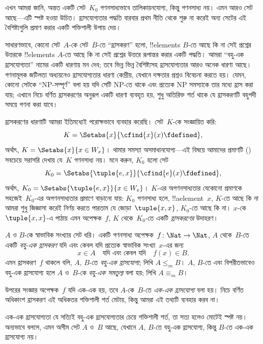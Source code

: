 \documentclass[../../../include/open-logic-section]{subfiles}
\begin{document}

\begin{explain}
এখন আমরা জানি, অন্তত একটি সেট~$K_0$ গণনসাধ্যভাবে তালিকায়নযোগ্য, কিন্তু
গণনসাধ্য নয়। এমন আরও সেট আছে—এটি স্পষ্ট হওয়া উচিত। হ্রাসযোগ্যতার
পদ্ধতি বারবার প্রথম নীতি থেকে শুরু না করেই অন্য সেটের এই বৈশিষ্ট্যগুলি
প্রমাণ করার একটি শক্তিশালী উপায় দেয়।

সাধারণভাবে, কোনো সেট~$A$-কে সেট~$B$-তে “হ্রাসকরণ” হলো, !!{element}s
$B$-তে আছে কি না সেই প্রশ্নের উত্তরকে !!{element}s $A$-তে আছে কি
না সেই প্রশ্নের উত্তরে রূপান্তর করার একটি পদ্ধতি। আমরা “বহু-এক
হ্রাসযোগ্যতা” নামের একটি ধারণায় মন দেব; তবে ভিন্ন ভিন্ন বৈশিষ্ট্যসহ
হ্রাসযোগ্যতার আরও অনেক ধারণা আছে। গণনামূলক জটিলতা অধ্যয়নেও হ্রাসযোগ্যতার
ধারণা কেন্দ্রীয়, যেখানে দক্ষতার প্রশ্নও বিবেচনা করতে হয়। যেমন, কোনো
সেটকে “NP-সম্পূর্ণ” বলা হয় যদি সেটি NP-তে থাকে এবং প্রত্যেক NP সমস্যাকে
তার মধ্যে হ্রাস করা যায়; এখানে নিচে বর্ণিত হ্রাসকরণের অনুরূপ একটি ধারণা
ব্যবহৃত হয়, শুধু অতিরিক্ত শর্ত থাকে যে হ্রাসকরণটি বহুপদী সময়ে গণনা করা
যাবে।

হ্রাসকরণের ধারণাটি আমরা ইতিমধ্যেই পরোক্ষভাবে ব্যবহার করেছি। সেট~$K$-কে
সংজ্ঞায়িত করি:
\[
K = \Setabs{x}{\cfind{x}(x) \fdefined},
\]
অর্থাৎ, $K = \Setabs{x}{x \in W_x}$। থামার সমস্যা অসমাধানযোগ্য—এই
বিষয়ে আমাদের প্রমাণটি () সবচেয়ে সরাসরি
দেখায় যে~$K$ গণনসাধ্য নয়। মনে করুন, $K_0$ হলো সেট
\[
K_0 = \Setabs{\tuple{e, x}}{\cfind{e}(x) \fdefined },
\]
অর্থাৎ, $K_0 = \Setabs{\tuple{e,x}}{x \in W_e}$। $K$-এর
অগণনসাধ্যতার যেকোনো প্রমাণকে সহজেই~$K_0$-এর অগণনসাধ্যতার প্রমাণে
বাড়ানো যায়: $K_0$ গণনসাধ্য হলে, !!a{element}~$x$, $K$-তে আছে কি না
আমরা শুধু জিজ্ঞাসা করেই নির্ণয় করতে পারতাম যে জোড়া~$\tuple{x, x}$,
$K_0$-তে আছে কি না। $x$-কে~$\tuple{x, x}$-এ পাঠায় এমন অপেক্ষক~$f$,
$K$ থেকে~$K_0$-তে একটি \emph{হ্রাসকরণের} উদাহরণ।
\end{explain}

\begin{defn}
$A$ ও $B$-কে স্বাভাবিক সংখ্যার সেট ধরি। একটি গণনসাধ্য
অপেক্ষক~$f\colon \Nat \to \Nat$, $A$ থেকে~$B$-তে একটি \emph{বহু-এক
হ্রাসকরণ} যদি এবং কেবল যদি প্রত্যেক স্বাভাবিক সংখ্যা~$x$-এর জন্য
\[
x \in A \quad \text{যদি এবং কেবল যদি} \quad f(x) \in B.
\]
এমন হ্রাসকরণ~$f$ থাকলে বলি, $A$, $B$-তে \emph{বহু-এক হ্রাসযোগ্য}; লিখি
$A \leq_m B$। $A$, $B$-তে এবং বিপরীতভাবেও বহু-এক হ্রাসযোগ্য হলে $A$
ও~$B$-কে \emph{বহু-এক সমতুল্য} বলা হয়; লিখি $A \equiv_m B$।
\end{defn}

উপরের সংজ্ঞার অপেক্ষক~$f$ যদি এক-এক হয়, তবে $A$-কে~$B$-তে
\emph{এক-এক হ্রাসযোগ্য} বলা হয়। নিচে বর্ণিত অধিকাংশ হ্রাসকরণ এই অধিকতর
শক্তিশালী শর্ত মেটায়, কিন্তু আমরা এই তথ্যটি ব্যবহার করব না।

\begin{digress}
এক-এক হ্রাসযোগ্যতা যে সত্যিই বহু-এক হ্রাসযোগ্যতার চেয়ে শক্তিশালী শর্ত,
তা সত্য হলেও মোটেই স্পষ্ট নয়। অন্যভাবে বললে, এমন অসীম সেট $A$ ও~$B$
আছে, যেখানে $A$, $B$-তে বহু-এক হ্রাসযোগ্য, কিন্তু $B$-তে এক-এক
হ্রাসযোগ্য নয়।
\end{digress}
\end{document}
